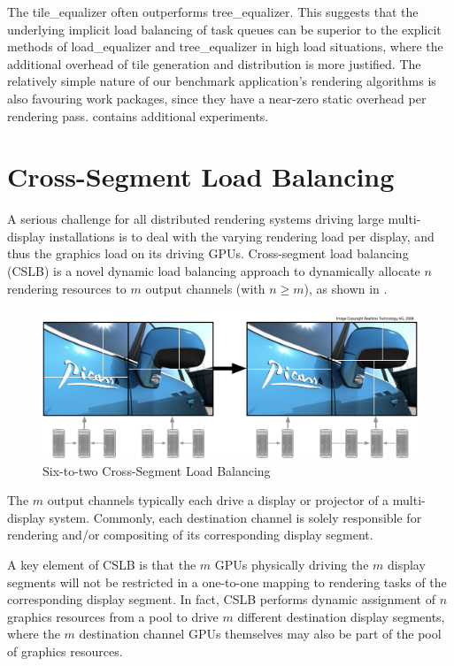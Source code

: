 The \textsf{tile\_equalizer} often outperforms \textsf{tree\_equalizer}. This
suggests that the underlying implicit load balancing of task queues can be
superior to the explicit methods of \textsf{load\_equalizer} and
\textsf{tree\_equalizer} in high load situations, where the additional overhead
of tile generation and distribution is more justified. The relatively simple
nature of our benchmark application's rendering algorithms is also favouring
work packages, since they have a near-zero static overhead per rendering pass.
\cite{SPEP:16} contains additional experiments.

\section{Cross-Segment Load Balancing}

A serious challenge for all distributed rendering systems driving large
multi-display installations is to deal with the varying rendering load per
display, and thus the graphics load on its driving GPUs. Cross-segment load
balancing (CSLB) is a novel dynamic load balancing approach to dynamically
allocate $n$ rendering resources to $m$ output channels (with $n\geq m$), as
shown in .

\begin{figure}[h!t]
  \includegraphics[width=\textwidth]{images/vieweq}
  \caption{\label{fvieweq}Six-to-two Cross-Segment Load Balancing}
\end{figure}

The $m$ output channels typically each drive a display or projector of a
multi-display system. Commonly, each destination channel is solely responsible
for rendering and/or compositing of its corresponding display segment.

A key element of CSLB is that the $m$ GPUs physically driving the $m$ display
segments will not be restricted in a one-to-one mapping to rendering tasks of
the corresponding display segment. In fact, CSLB performs dynamic assignment of
$n$ graphics resources from a pool to drive $m$ different destination display
segments, where the $m$ destination channel GPUs themselves may also be part of
the pool of graphics resources.

